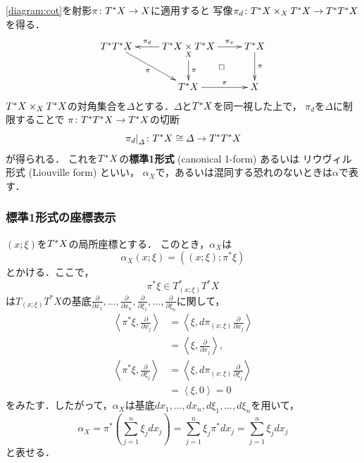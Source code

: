 \eqref{diagram:cot}を射影\(\pi\colon \cotb[X]\to X\)に適用すると
写像\(
    \mdiff[\pi]\colon
    \cotb[X]
    \tpb[X]
    \cotb[X]\to\cotb[{\cotb[X]}]
\)を得る．
\begin{equation*}%
    \vcenter{\xymatrix{
      T^{\ast}\cotb[X]
      \ar[rd]_-{\pi}
      &
      \cotb[X]\pb[X]\cotb[X]
      \ar[l]_-{\pi_{d}}
      \ar[r]^-{\pi_{\pi}}
      \ar[d]^-{\pi}
      \ar@{}[dr]|\square
      &
      \cotb[X]
      \ar[d]^-{\pi}
      \\
      &\cotb[X]\ar[r]^-{\pi}&X
}}\end{equation*}
\(\cotb[X]\tpb[X]\cotb[X]\)の対角集合を\(
    \varDelta
\)とする．\(\varDelta\)と\(\cotb[X]\)を同一視した上で，
\(\pi_{d}\)を\(\varDelta\)に制限することで
\(\pi\colon\cotb[{\cotb[X]}]\to\cotb[X]\)の切断
\[
    \mres[\pi_{d}]{\varDelta}\colon
    \cotb[X]
    \cong\varDelta
    \to\cotb[{\cotb[X]}]
\]    
が得られる．
これを\(\cotb[X]\)の\textbf{標準1形式} (canonical 1-form) あるいは
リウヴィル形式 (Liouville form) といい，
\(\alpha_X\)で，あるいは混同する恐れのないときは\(\alpha\)で表す．

\subsubsection*{標準1形式の座標表示}

\((x;\xi)\)を\(\cotb[X]\)の局所座標とする．
このとき，\(\alpha_X\)は
\[
    \alpha_{X}(x;\xi)=((x;\xi);\pi^{\ast}\xi)
\]
とかける．ここで，\[
    \pi^{\ast}\xi\in T^{\ast}_{(x;\xi)}T^{\ast}X
\]は\(T_{(x;\xi)}T^{\ast}X\)の基底\(
    \frac{\partial}{\partial x_{1}},
    \dots,
    \frac{\partial}{\partial x_{n}},
    \frac{\partial}{\partial \xi_{1}},
    \dots,
    \frac{\partial}{\partial \xi_{n}}
\)に関して，
\begin{align*}
    \left\langle \pi^{\ast}\xi, \frac{\partial}{\partial x_{j}}\right\rangle
    &=
    \left\langle \xi, d\pi_{(x;\xi)}\frac{\partial}{\partial x_{j}}\right\rangle\\
    &=
    \left\langle \xi, \frac{\partial}{\partial x_{j}}\right\rangle,\\
    \left\langle \pi^{\ast}\xi, \frac{\partial}{\partial \xi_{j}}\right\rangle
    &=
    \left\langle \xi, d\pi_{(x;\xi)}\frac{\partial}{\partial \xi_{j}}\right\rangle\\
    &=
    \left\langle \xi, 0\right\rangle=0
\end{align*}
をみたす．したがって，\(\alpha_X\)は基底\(dx_{1},\dots,dx_{n},d\xi_{1},\dots,d\xi_{n}\)を用いて，
\[
    \alpha_X
    =\pi^{\ast}\left(
        \sum_{j=1}^{n}\xi_{j}dx_{j}
    \right)
    =\sum_{j=1}^{n}\xi_{j}\pi^{\ast}dx_{j}
    =\sum_{j=1}^{n}\xi_{j}dx_{j}
\]
と表せる．

